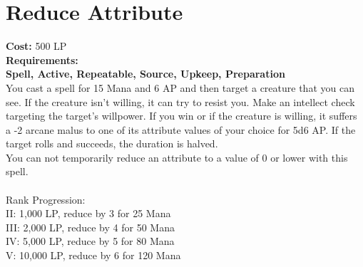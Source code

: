 \section{Reduce Attribute}\label{spell:reduceAbility}
\textbf{Cost:} 500 LP\\
\textbf{Requirements:}\\
\textbf{Spell, Active, Repeatable, Source, Upkeep, Preparation}\\
You cast a spell for 15 Mana and 6 AP and then target a creature that you can see.
If the creature isn't willing, it can try to resist you.
Make an intellect check targeting the target's willpower.
If you win or if the creature is willing, it suffers a -2 arcane malus to one of its attribute values of your choice for 5d6 AP.
If the target rolls and succeeds, the duration is halved.\\
You can not temporarily reduce an attribute to a value of 0 or lower with this spell. \\
\\
Rank Progression:\\
II: 1,000 LP, reduce by 3 for 25 Mana\\
III: 2,000 LP, reduce by 4 for 50 Mana\\
IV: 5,000 LP, reduce by 5 for 80 Mana\\
V: 10,000 LP, reduce by 6 for 120 Mana\\